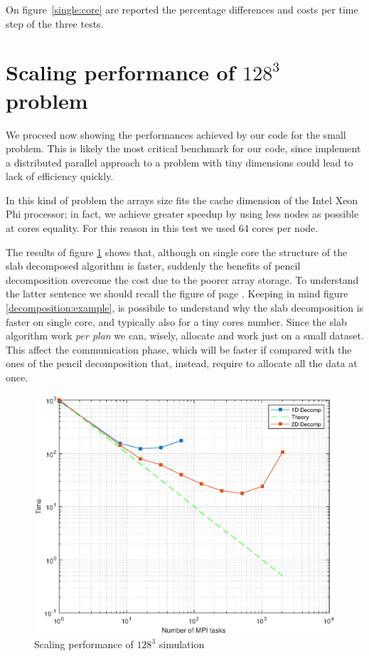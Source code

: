 On figure~\ref{single:core} are reported the percentage differences and costs per time step of the three tests.



\section{Scaling performance of $128^3$ problem}
We proceed now showing the performances achieved by our code for the small problem.
This is likely the most critical benchmark for our code, since implement a distributed parallel approach to a problem with tiny dimensions could lead to lack of efficiency quickly. 
\par
In this kind of problem the arrays size fits the cache dimension of the Intel Xeon Phi processor; in fact, we achieve greater speedup by using less nodes as possible at cores equality. For this reason in this test we used 64 cores per node. 
\par
The results of figure \ref{641} shows that, although on single core the structure of the slab decomposed algorithm is faster, suddenly the benefits of pencil decomposition overcome the cost due to the poorer array storage.
To understand the latter sentence we should recall the figure of page \pageref{decomposition:example}.
Keeping in mind figure \ref{decomposition:example}, is possibile to understand why the slab decomposition is faster on single core, and typically also for a tiny cores number. Since the slab algorithm work \emph{per plan} we can, wisely, allocate and work just on a small dataset. This affect the communication phase, which will be faster if compared with the ones of the pencil decomposition that, instead, require to allocate all the data at once. 
\par

\begin{figure}
\begin{center}
\includegraphics[scale=0.55]{grafici/641}
\caption{Scaling performance of $128^3$ simulation}
\label{641}
\end{center}
\end{figure}

